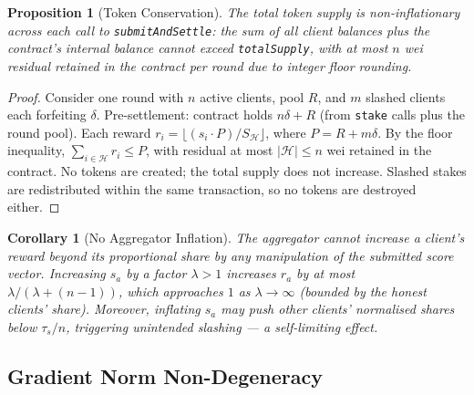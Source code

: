 \documentclass[journal]{IEEEtran}
\newtheorem{proposition}[theorem]{Proposition}
\newtheorem{corollary}[theorem]{Corollary}
\theoremstyle{definition}
\theoremstyle{remark}
\begin{document}
\begin{proposition}[Token Conservation]
\label{prop:conservation}
The total token supply is non-inflationary across each call to
\texttt{submitAndSettle}: the sum of all client balances plus the
contract's internal balance cannot exceed \texttt{totalSupply},
with at most $n$ wei residual retained in the contract per round
due to integer floor rounding.
\end{proposition}
\begin{proof}
Consider one round with $n$ active clients, pool $R$, and $m$ slashed
clients each forfeiting $\delta$.
Pre-settlement: contract holds $n\delta + R$ (from \texttt{stake} calls
plus the round pool).
Each reward $r_i = \lfloor (s_i \cdot P) / S_{\mathcal{H}} \rfloor$,
where $P = R + m\delta$.
By the floor inequality, $\sum_{i\in\mathcal{H}} r_i \leq P$, with
residual at most $|\mathcal{H}| \leq n$ wei retained in the contract.
No tokens are created; the total supply does not increase.
Slashed stakes are redistributed within the same transaction, so no
tokens are destroyed either.
\end{proof}

\begin{corollary}[No Aggregator Inflation]
\label{cor:no_inflation}
The aggregator cannot increase a client's reward beyond its
proportional share by any manipulation of the submitted score
vector.
Increasing $s_a$ by a factor $\lambda > 1$ increases $r_a$ by at
most $\lambda / (\lambda + (n-1))$, which approaches $1$ as
$\lambda \to \infty$ (bounded by the honest clients' share).
Moreover, inflating $s_a$ may push other clients' normalised shares
below $\tau_s / n$, triggering unintended slashing --- a
self-limiting effect.
\end{corollary}

\subsection{Gradient Norm Non-Degeneracy}
\end{document}

